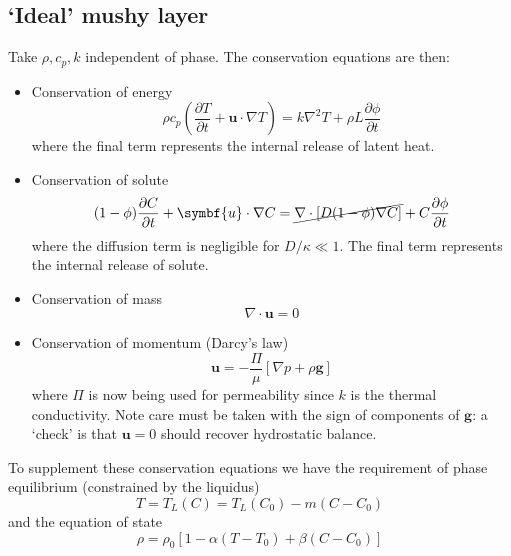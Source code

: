 \documentclass{jknotes}
\renewcommand{\u}{\symbf{u}}
\begin{document}
\subsection{`Ideal' mushy layer} 
Take $\rho, c_p, k$ independent of phase. The conservation equations are then:
\begin{itemize}
	\item Conservation of energy
		\begin{equation}
			\rho c_p \left( \frac{\partial T}{\partial t} + \u \cdot \nabla
			T\right) = k \nabla^2 T + \rho L \frac{\partial \phi}{\partial t}
			\label{eq:l11:1}
		\end{equation}
		where the final term represents the internal release of latent heat.
	\item Conservation of solute
		\begin{equation}
			(1-\phi)\frac{\partial C}{\partial t} + \u \cdot \nabla C =
			\cancel{\nabla \cdot \left[ D(1-\phi) \nabla C\right]} + C \frac{\partial
			\phi}{\partial t}\label{eq:l11:2}
		\end{equation}
		where the diffusion term is negligible for $D/\kappa \ll 1$. The final
		term represents the internal release of solute.
	\item Conservation of mass
		\begin{equation}
			\nabla \cdot \u = 0 \label{eq:l11:3}
		\end{equation}
	\item Conservation of momentum (Darcy's law)
		\begin{equation}
			\u = -\frac{\Pi}{\mu} \left[ \nabla p + \rho \symbf{g}\right]\label{eq:l11:4}
		\end{equation}
		where $\Pi$ is now being used for permeability since $k$ is the
		thermal conductivity. Note care must be taken with the sign of
		components of $\symbf{g}$: a `check' is that $\u = 0$ should recover
		hydrostatic balance.
\end{itemize}
To supplement these conservation equations we have the requirement of phase
equilibrium (constrained by the liquidus)
\begin{equation}
	T = T_L(C) = T_L(C_0) - m(C-C_0)\label{eq:l11:5}
\end{equation}
and the equation of state
\begin{equation}
	\rho = \rho_0 \left[ 1 - \alpha(T-T_0) + \beta
	(C-C_0)\right]\label{eq:l11:6}
\end{equation}
\end{document}

